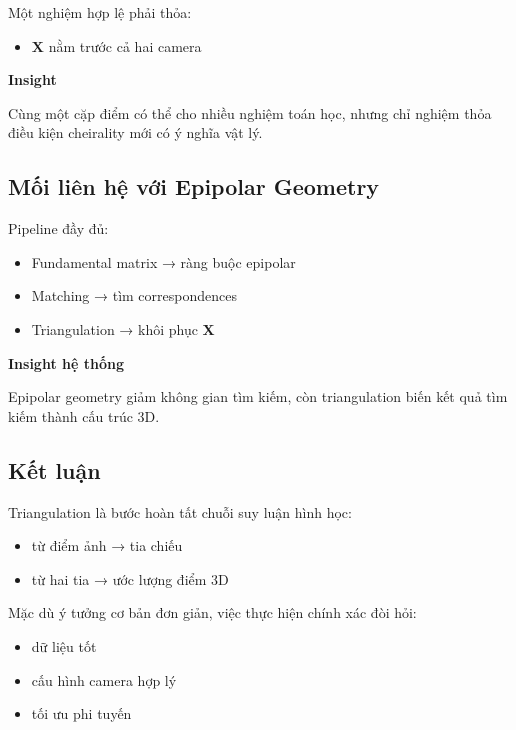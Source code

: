 Một nghiệm hợp lệ phải thỏa:

\begin{itemize}
	\item $\mathbf{X}$ nằm trước cả hai camera
\end{itemize}

\begin{mdframed}[style=infobox]
	\textbf{Insight}
	
	Cùng một cặp điểm có thể cho nhiều nghiệm toán học, nhưng chỉ nghiệm thỏa điều kiện cheirality mới có ý nghĩa vật lý.
\end{mdframed}

\subsection{Mối liên hệ với Epipolar Geometry}
\label{subsec:triangulation_epipolar}

Pipeline đầy đủ:

\begin{itemize}
	\item Fundamental matrix → ràng buộc epipolar
	\item Matching → tìm correspondences
	\item Triangulation → khôi phục $\mathbf{X}$
\end{itemize}

\begin{mdframed}[style=infobox]
	\textbf{Insight hệ thống}
	
	Epipolar geometry giảm không gian tìm kiếm, còn triangulation biến kết quả tìm kiếm thành cấu trúc 3D.
\end{mdframed}

\subsection{Kết luận}
\label{subsec:triangulation_conclusion}

Triangulation là bước hoàn tất chuỗi suy luận hình học:

\begin{itemize}
	\item từ điểm ảnh → tia chiếu
	\item từ hai tia → ước lượng điểm 3D
\end{itemize}

Mặc dù ý tưởng cơ bản đơn giản, việc thực hiện chính xác đòi hỏi:

\begin{itemize}
	\item dữ liệu tốt
	\item cấu hình camera hợp lý
	\item tối ưu phi tuyến
\end{itemize}

